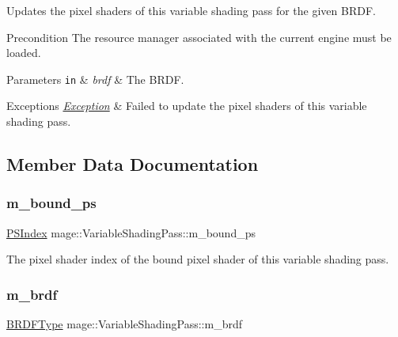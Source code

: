 Updates the pixel shaders of this variable shading pass for the given B\+R\+DF.

\begin{DoxyPrecond}{Precondition}
The resource manager associated with the current engine must be loaded. 
\end{DoxyPrecond}

\begin{DoxyParams}[1]{Parameters}
\mbox{\tt in}  & {\em brdf} & The B\+R\+DF. \\
\hline
\end{DoxyParams}

\begin{DoxyExceptions}{Exceptions}
{\em \hyperlink{classmage_1_1_exception}{Exception}} & Failed to update the pixel shaders of this variable shading pass. \\
\hline
\end{DoxyExceptions}


\subsection{Member Data Documentation}
\hypertarget{classmage_1_1_variable_shading_pass_acb1d0d78a9de9afc2d668d87134c5ec5}{}\label{classmage_1_1_variable_shading_pass_acb1d0d78a9de9afc2d668d87134c5ec5} 
\subsubsection{\texorpdfstring{m\+\_\+bound\+\_\+ps}{m\_bound\_ps}}
{\footnotesize\ttfamily \hyperlink{classmage_1_1_variable_shading_pass_a99a5986785950a884405617f8d05cae5}{P\+S\+Index} mage\+::\+Variable\+Shading\+Pass\+::m\+\_\+bound\+\_\+ps\hspace{0.3cm}{\ttfamily [private]}}

The pixel shader index of the bound pixel shader of this variable shading pass. \hypertarget{classmage_1_1_variable_shading_pass_ac6147f2068fd7727fe2d78584ff68767}{}\label{classmage_1_1_variable_shading_pass_ac6147f2068fd7727fe2d78584ff68767} 
\subsubsection{\texorpdfstring{m\+\_\+brdf}{m\_brdf}}
{\footnotesize\ttfamily \hyperlink{namespacemage_af1044f87544bc38427766a8c795d2f26}{B\+R\+D\+F\+Type} mage\+::\+Variable\+Shading\+Pass\+::m\+\_\+brdf\hspace{0.3cm}{\ttfamily [private]}}

